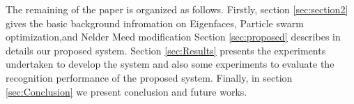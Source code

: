 \documentclass[a4paper,twoside]{article}
\begin{document}
 

The remaining of the paper is organized as follows. Firstly, section \ref{sec:section2} gives the basic background infromation on  Eigenfaces, Particle swarm optimization,and Nelder Meed modification Section \ref{sec:proposed} describes in details our proposed system. Section \ref{sec:Results} presents the experiments undertaken to develop the system and also some experiments to evaluate the recognition performance of the proposed system. Finally, in section \ref{sec:Conclusion} we present conclusion and future works.
\end{document}
